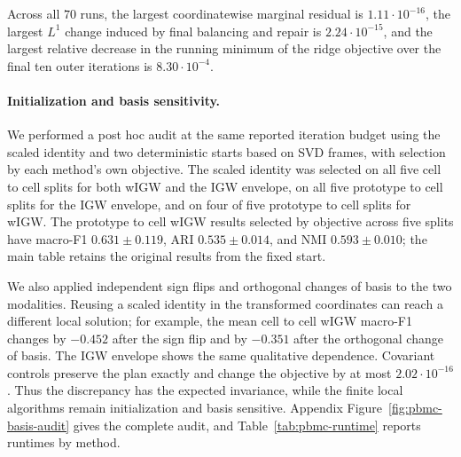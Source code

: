 \documentclass[11pt]{article}
\theoremstyle{plain}
\theoremstyle{definition}
\theoremstyle{remark}
\begin{document}
Across all \(70\) runs, the largest coordinatewise marginal residual is
\(1.11\cdot10^{-16}\), the largest \(L^1\) change induced by final balancing and
repair is
\(2.24\cdot10^{-15}\), and the largest relative decrease in the running minimum
of the ridge objective over the final ten outer iterations is
\(8.30\cdot10^{-4}\).

\paragraph{Initialization and basis sensitivity.}
We performed a post hoc audit at the same reported iteration budget using the scaled
identity and two deterministic starts based on SVD frames, with selection by each
method's own objective. The scaled identity was selected on all five cell to cell splits
for both wIGW and the IGW envelope, on all five prototype to cell splits for the IGW
envelope, and on four of five prototype to cell splits for wIGW. The
prototype to cell wIGW results selected by objective across five splits have macro-F1 \(0.631\pm0.119\), ARI
\(0.535\pm0.014\), and NMI \(0.593\pm0.010\); the main table retains the original
results from the fixed start.

We also applied independent sign flips and orthogonal changes of basis to the two
modalities. Reusing a scaled identity in the transformed coordinates can reach
a different local solution; for example, the mean cell to cell wIGW macro-F1 changes
by \(-0.452\) after the sign flip and by \(-0.351\) after the orthogonal change
of basis.
The IGW envelope shows the same qualitative dependence. Covariant controls preserve
the plan exactly and change the objective by at most \(2.02\cdot10^{-16}\). Thus the
discrepancy has the expected invariance, while the finite local algorithms remain
initialization and basis sensitive. Appendix
Figure~\ref{fig:pbmc-basis-audit} gives the complete audit, and
Table~\ref{tab:pbmc-runtime} reports runtimes by method.
\end{document}

